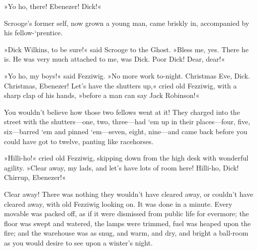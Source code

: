 »Yo ho, there! Ebenezer! Dick!«

Scrooge's former self, now grown a young man, came briskly in, accompanied by his fellow-`prentice.

»Dick Wilkins, to be sure!« said Scrooge to the Ghost. »Bless me, yes. There he is. He was very much attached to me, was Dick. Poor Dick! Dear, dear!«

»Yo ho, my boys!« said Fezziwig. »No more work to-night. Christmas Eve, Dick. Christmas, Ebenezer! Let's have the shutters up,« cried old Fezziwig, with a sharp clap of his hands, »before a man can say Jack Robinson!«

You wouldn't believe how those two fellows went at it! They charged into the street with the shutters—one, two, three—had `em up in their places—four, five, six—barred `em and pinned `em—seven, eight, nine—and came back before you could have got to twelve, panting like racehorses.

»Hilli-ho!« cried old Fezziwig, skipping down from the high desk with wonderful agility. »Clear away, my lads, and let's have lots of room here! Hilli-ho, Dick! Chirrup, Ebenezer!«

Clear away! There was nothing they wouldn't have cleared away, or couldn't have cleared away, with old Fezziwig looking on. It was done in a minute. Every movable was packed off, as if it were dismissed from public life for evermore; the floor was swept and watered, the lamps were trimmed, fuel was heaped upon the fire; and the warehouse was as snug, and warm, and dry, and bright a ball-room as you would desire to see upon a winter's night.

